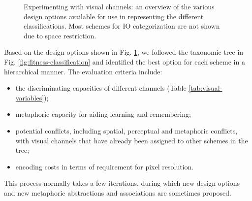 \begin{figure}[t!]
\caption{Experimenting with visual channels: an overview of the various design options available for use in representing the different classifications. Most schemes for IO categorization are not shown due to space restriction.}
\label{fig:design-options}
\vspace{-10pt}
\end{figure}

Based on the design options shown in Fig. \ref{fig:design-options}, we followed the taxonomic tree in Fig. \ref{fig:fitness-classification} and identified the best option for each scheme in a hierarchical manner.
The evaluation criteria include:
%
\begin{itemize}
\vspace{-1mm}
\item
the discriminating capacities of different channels (Table \ref{tab:visual-variables});
\vspace{-2mm}
\item
metaphoric capacity for aiding learning and remembering;
\vspace{-2mm}
\item
potential conflicts, including spatial, perceptual and metaphoric conflicts, with visual channels that have already been assigned to other schemes in the tree;
\vspace{-2mm}
\item
encoding costs in terms of requirement for pixel resolution.
\end{itemize}

This process normally takes a few iterations, during which new design options and new metaphoric abstractions and associations are sometimes proposed.

